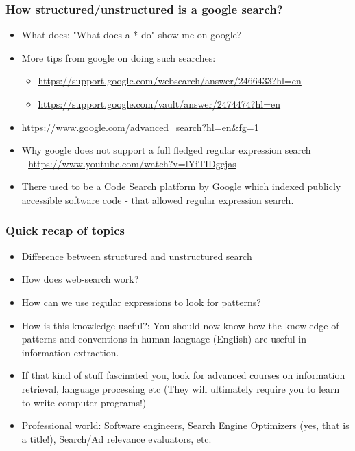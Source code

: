 \documentclass{beamer}
\begin{document}

\begin{frame}
\frametitle{How structured/unstructured is a google search?}
\begin{itemize}
\item What does: "What does a * do" show me on google? \pause
\item More tips from google on doing such searches:
\begin{itemize}
\item \url{https://support.google.com/websearch/answer/2466433?hl=en}
\item \url{https://support.google.com/vault/answer/2474474?hl=en}
\end{itemize}
\item \url{https://www.google.com/advanced_search?hl=en&fg=1} \pause
\item Why google does not support a full fledged regular expression search \\ - \url{https://www.youtube.com/watch?v=lYiTIDgejas} \pause
\item There used to be a Code Search platform by Google which indexed publicly accessible software code - that allowed regular expression search. 
\end{itemize}
\end{frame}

\begin{frame}
\frametitle{Quick recap of topics}
\begin{itemize}
\item Difference between structured and unstructured search
\item How does web-search work?
\item How can we use regular expressions to look for patterns? \pause
\item How is this knowledge useful?: You should now know how the knowledge of patterns and conventions in human language (English) are useful in information extraction. \pause
\item If that kind of stuff fascinated you, look for advanced courses on information retrieval, language processing etc (They will ultimately require you to learn to write computer programs!) \pause
\item Professional world: Software engineers, Search Engine Optimizers (yes, that is a title!), Search/Ad relevance evaluators, etc.
\end{itemize}
\end{frame}
\end{document}
